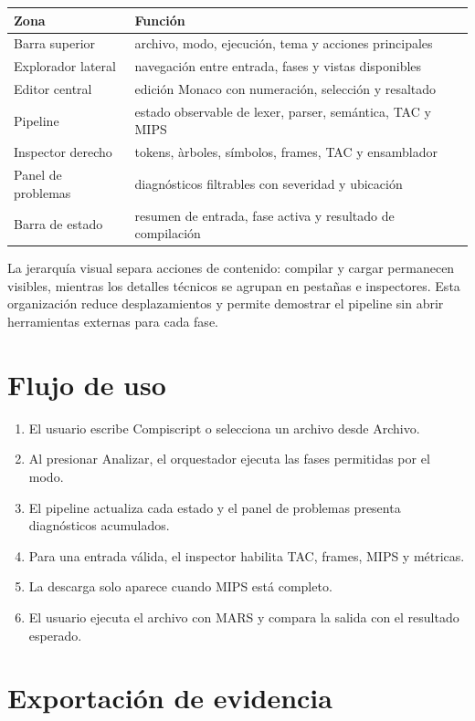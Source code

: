 \documentclass[11pt,letterpaper,oneside]{report}
\newcommand{\archivo}[1]{\path{#1}}
\begin{document}
\begin{longtable}{p{3.2cm}p{9.9cm}}
\toprule
Zona & Funci\'on\\\midrule
\endhead
Barra superior & archivo, modo, ejecuci\'on, tema y acciones principales\\
Explorador lateral & navegaci\'on entre entrada, fases y vistas disponibles\\
Editor central & edici\'on Monaco con numeraci\'on, selecci\'on y resaltado\\
Pipeline & estado observable de lexer, parser, sem\'antica, TAC y MIPS\\
Inspector derecho & tokens, \`arboles, s\'imbolos, frames, TAC y ensamblador\\
Panel de problemas & diagn\'osticos filtrables con severidad y ubicaci\'on\\
Barra de estado & resumen de entrada, fase activa y resultado de compilaci\'on\\
\bottomrule
\end{longtable}

La jerarqu\'ia visual separa acciones de contenido: compilar y cargar permanecen visibles, mientras los detalles t\'ecnicos se agrupan en pesta\~nas e inspectores. Esta organizaci\'on reduce desplazamientos y permite demostrar el pipeline sin abrir herramientas externas para cada fase.

\section{Flujo de uso}

\begin{enumerate}
  \item El usuario escribe Compiscript o selecciona un archivo \archivo{.cps} desde Archivo.
  \item Al presionar Analizar, el orquestador ejecuta las fases permitidas por el modo.
  \item El pipeline actualiza cada estado y el panel de problemas presenta diagn\'osticos acumulados.
  \item Para una entrada v\'alida, el inspector habilita TAC, frames, MIPS y m\'etricas.
  \item La descarga \archivo{compiscript.asm} solo aparece cuando MIPS est\'a completo.
  \item El usuario ejecuta el archivo con MARS y compara la salida con el resultado esperado.
\end{enumerate}

\section{Exportaci\'on de evidencia}
\end{document}
